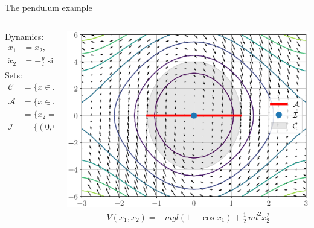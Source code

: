 \documentclass[aspectratio=169]{beamer}
\begin{document}
\begin{frame}{The pendulum example}
	\begin{columns}
		\begin{column}{0.3\textwidth}
			Dynamics:
			\begin{equation*}
				\begin{aligned}
					\dot{x}_1 &= x_2, \\
					\dot{x}_2 &= -\frac{g}{l} \sin(x_1) - \frac{r}{m l^2}x_2
				\end{aligned}
			\end{equation*}
		Sets:
		\begin{equation*}
			\begin{aligned}
				\mathcal{C} &= \{x \in \mathcal{X}|\; V(x_1, x_2) \le k\}, \\
				\mathcal{A} &= \{x \in \mathcal{X}|\; \dot{V} = 0\} \cap \mathcal{C}, \\
							&= \{x_2=0\} \cap \mathcal{C}, \\
				\mathcal{I} &= \{(0, 0)\}
			\end{aligned}
		\end{equation*}
		\end{column}
	\begin{column}{0.7\textwidth}
		\centering
		\includegraphics[width=.85\columnwidth]{pendulum.eps}
		\begin{equation*}
			\begin{aligned}
				V(x_1, x_2) = &m g l(1-\cos{x_1}) + \frac{1}{2}\, m l^2 x_2^2
			\end{aligned}
		\end{equation*}
	\end{column}
		
		
	\end{columns}
\end{frame}
\end{document}
